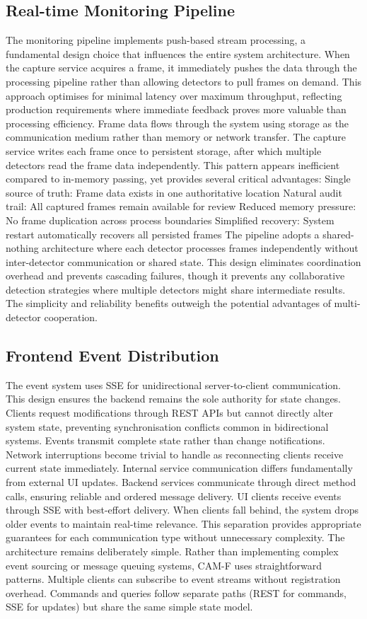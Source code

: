 \subsection{Real-time Monitoring Pipeline}
The monitoring pipeline implements push-based stream processing, a fundamental design choice that influences the entire system architecture. When the capture service acquires a frame, it immediately pushes the data through the processing pipeline rather than allowing detectors to pull frames on demand. This approach optimises for minimal latency over maximum throughput, reflecting production requirements where immediate feedback proves more valuable than processing efficiency.
Frame data flows through the system using storage as the communication medium rather than memory or network transfer. The capture service writes each frame once to persistent storage, after which multiple detectors read the frame data independently. This pattern appears inefficient compared to in-memory passing, yet provides several critical advantages:
Single source of truth: Frame data exists in one authoritative location
Natural audit trail: All captured frames remain available for review
Reduced memory pressure: No frame duplication across process boundaries
Simplified recovery: System restart automatically recovers all persisted frames
The pipeline adopts a shared-nothing architecture where each detector processes frames independently without inter-detector communication or shared state. This design eliminates coordination overhead and prevents cascading failures, though it prevents any collaborative detection strategies where multiple detectors might share intermediate results. The simplicity and reliability benefits outweigh the potential advantages of multi-detector cooperation.
\subsection{Frontend Event Distribution}
The event system uses SSE for unidirectional server-to-client communication. This design ensures the backend remains the sole authority for state changes. Clients request modifications through REST APIs but cannot directly alter system state, preventing synchronisation conflicts common in bidirectional systems. Events transmit complete state rather than change notifications. Network interruptions become trivial to handle as reconnecting clients receive current state immediately. Internal service communication differs fundamentally from external UI updates. Backend services communicate through direct method calls, ensuring reliable and ordered message delivery. UI clients receive events through SSE with best-effort delivery. When clients fall behind, the system drops older events to maintain real-time relevance. This separation provides appropriate guarantees for each communication type without unnecessary complexity.
The architecture remains deliberately simple. Rather than implementing complex event sourcing or message queuing systems, CAM-F uses straightforward patterns. Multiple clients can subscribe to event streams without registration overhead. Commands and queries follow separate paths (REST for commands, SSE for updates) but share the same simple state model.
